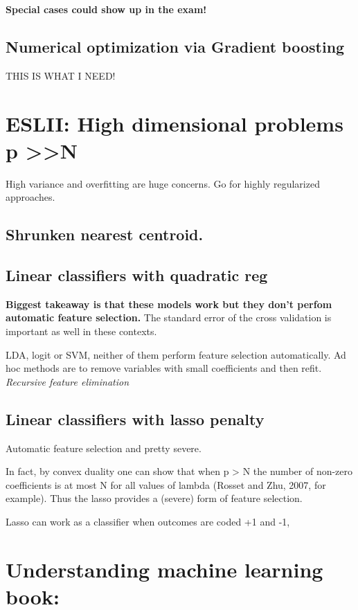 \documentclass{article}
\begin{document}
\textbf{Special cases could show up in the exam!}

\subsection{Numerical optimization via Gradient boosting}
THIS IS WHAT I NEED!





\section{ESLII: High dimensional problems p >>N}
High variance and overfitting are huge concerns.
Go for highly regularized approaches.

\subsection{Shrunken nearest centroid.}


\subsection{Linear classifiers with quadratic reg}
\textbf{Biggest takeaway is that these models work but they don't perfom automatic feature selection.}
The standard error of the cross validation is important as well in these contexts.

LDA, logit or SVM, neither of them perform feature selection automatically.
Ad hoc methods are to remove variables with small coefficients and then refit. \textit{Recursive feature elimination}

\subsection{Linear classifiers with lasso penalty}
Automatic feature selection and pretty severe.

In fact, by convex duality one can show that when p > N the number of non-zero
coefficients is at most N for all values of lambda (Rosset and Zhu, 2007, for
example). Thus the lasso provides a (severe) form of feature selection.

Lasso can work as a classifier when outcomes are coded +1 and -1, 


\section{Understanding machine learning book:}
\end{document}
